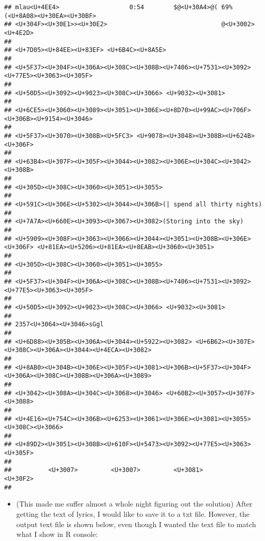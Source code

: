 \documentclass[
]{article}
\providecommand{\tightlist}{%
  \setlength{\itemsep}{0pt}\setlength{\parskip}{0pt}}
\begin{document}
\begin{verbatim}
## mlau<U+4EE4>                   0:54        $@<U+30A4>@( 69%(<U+8A08><U+30EA><U+30BF>
## <U+304F><U+30E1>><U+30E2>                               @<U+3002> <U+4E2D>
## 
## <U+7D05><U+84EE><U+83EF> <U+6B4C><U+8A5E>
## 
## <U+5F37><U+304F><U+306A><U+308C><U+308B><U+7406><U+7531><U+3092><U+77E5><U+3063><U+305F>
## 
## <U+50D5><U+3092><U+9023><U+308C><U+3066> <U+9032><U+3081>
## 
## <U+6CE5><U+3060><U+3089><U+3051><U+306E><U+8D70><U+99AC><U+706F><U+306B><U+9154><U+3046>
## 
## <U+5F37><U+3070><U+308B><U+5FC3> <U+9078><U+3048><U+308B><U+624B><U+306F>
## 
## <U+63B4><U+307F><U+305F><U+3044><U+3082><U+306E><U+304C><U+3042><U+308B>
## 
## <U+305D><U+308C><U+3060><U+3051><U+3055>
## 
## <U+591C><U+306E><U+5302><U+3044><U+306B>(| spend all thirty nights)
## 
## <U+7A7A><U+660E><U+3093><U+3067><U+3082>(Storing into the sky)
## 
## <U+5909><U+308F><U+3063><U+3066><U+3044><U+3051><U+308B><U+306E><U+306F> <U+81EA><U+5206><U+81EA><U+8EAB><U+3060><U+3051>
## 
## <U+305D><U+308C><U+3060><U+3051><U+3055>
## 
## <U+5F37><U+304F><U+306A><U+308C><U+308B><U+7406><U+7531><U+3092><U+77E5><U+3063><U+305F>
## 
## <U+50D5><U+3092><U+9023><U+308C><U+3066> <U+9032><U+3081>
## 
## 2357<U+3064><U+3046>sGgl
## 
## <U+6D88><U+305B><U+306A><U+3044><U+5922><U+3082> <U+6B62><U+307E><U+308C><U+306A><U+3044><U+4ECA><U+3082>
## 
## <U+8AB0><U+304B><U+306E><U+305F><U+3081><U+306B><U+5F37><U+304F><U+306A><U+308C><U+308B><U+306A><U+3089>
## 
## <U+3042><U+308A><U+304C><U+3068><U+3046> <U+60B2><U+3057><U+307F><U+3088>
## 
## <U+4E16><U+754C><U+306B><U+6253><U+3061><U+306E><U+3081><U+3055><U+308C><U+3066>
## 
## <U+89D2><U+3051><U+308B><U+610F><U+5473><U+3092><U+77E5><U+3063><U+305F>
## 
##          <U+3007>         <U+3007>         <U+3081>         <U+30F2>
## 
\end{verbatim}

\begin{itemize}
\tightlist
\item
  (This made me suffer almost a whole night figuring out the solution)
  After getting the text of lyrics, I would like to save it to a txt
  file. However, the output text file is shown below, even though I
  wanted the text file to match what I show in R console:
\end{itemize}
\end{document}
